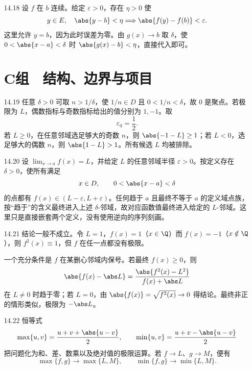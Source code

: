 \begin{solution}{14.18}
设 \(f\) 在 \(b\) 连续。给定 \(\varepsilon>0\)，存在 \(\eta>0\) 使
\[
 y\in E,\quad\abs{y-b}<\eta
 \Longrightarrow\abs{f(y)-f(b)}<\varepsilon.
\]
这里允许 \(y=b\)，因为此时误差为零。由 \(g(x)\to b\) 取 \(\delta\)，使 \(0<\abs{x-a}<\delta\) 时 \(\abs{g(x)-b}<\eta\)，直接代入即可。
\end{solution}

\section*{C组　结构、边界与项目}

\begin{solution}{14.19}
任意 \(\delta>0\) 可取 \(n>1/\delta\)，使 \(1/n\in D\) 且 \(0<1/n<\delta\)，故 \(0\) 是聚点。若极限为 \(L\)，偶数指标与奇数指标给出的值分别为 \(1,-1\)。取
\[
 \varepsilon_0=\frac12.
\]
若 \(L\ge0\)，在任意邻域选足够大的奇数 \(n\)，则 \(\abs{-1-L}\ge1\)；若 \(L<0\)，选足够大的偶数 \(n\)，则 \(\abs{1-L}>1\)。所有候选 \(L\) 均被排除。
\end{solution}

\begin{solution}{14.20}
设 \(\lim_{x\to a}f(x)=L\)，并给定 \(L\) 的任意邻域半径 \(\varepsilon>0\)。按定义存在 \(\delta>0\)，使所有满足
\[
 x\in D,\qquad0<\abs{x-a}<\delta
\]
的点都有 \(f(x)\in(L-\varepsilon,L+\varepsilon)\)。任何趋于 \(a\) 且最终不等于 \(a\) 的定义域点族，按“趋于”的含义最终进入上述 \(\delta\)-邻域，故对应函数值最终进入给定的 \(L\)-邻域。这里只是直接嵌套两个定义，没有使用逆向的序列刻画。
\end{solution}

\begin{solution}{14.21}
结论一般不成立。令 \(L=1\)，\(f(x)=1\)（\(x\in\Q\)）而 \(f(x)=-1\)（\(x\notin\Q\)），则 \(f^2(x)\equiv1\)，但 \(f\) 在任一点都没有极限。

一个充分条件是 \(f\) 在某删心邻域内保号。若最终 \(f(x)\ge0\)，则
\[
 \abs{f(x)-\abs L}
 =\frac{\abs{f^2(x)-L^2}}{f(x)+\abs L}
\]
在 \(L\ne0\) 时趋于零；若 \(L=0\)，由 \(\abs{f(x)}=\sqrt{f^2(x)}\to0\) 得结论。最终非正的情形类似，极限为 \(-\abs L\)。
\end{solution}

\begin{solution}{14.22}
恒等式
\[
 \max\{u,v\}=\frac{u+v+\abs{u-v}}2,\qquad
 \min\{u,v\}=\frac{u+v-\abs{u-v}}2
\]
把问题化为和、差、数乘以及绝对值的极限运算。若 \(f\to L\)、\(g\to M\)，便有
\[
 \max\{f,g\}\to\max\{L,M\},\qquad
 \min\{f,g\}\to\min\{L,M\}.
\]
\end{solution}

